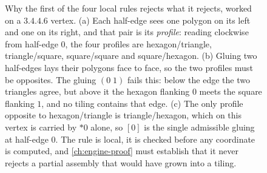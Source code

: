 \begin{figure}[htbp]
\centering

\caption[The mismatch rule, worked on $3.4.4.6$]{Why the first of the four
local rules rejects what it rejects, worked on a $3.4.4.6$ vertex. (a) Each
half-edge sees one polygon on its left and one on its right, and that pair is
its \emph{profile}: reading clockwise from half-edge $0$, the four profiles are
hexagon/triangle, triangle/square, square/square and square/hexagon. (b)
Gluing two half-edges lays their polygons face to face, so the two profiles
must be opposites. The gluing $(0\;1)$ fails this: below the edge the two
triangles agree, but above it the hexagon flanking $0$ meets the square
flanking $1$, and no tiling contains that edge. (c) The only profile opposite
to hexagon/triangle is triangle/hexagon, which on this vertex is carried by
$*0$ alone, so $[0]$ is the single admissible gluing at half-edge $0$. The
rule is local, it is checked before any coordinate is computed, and
\cref{ch:engine-proof} must establish that it never rejects a partial assembly
that would have grown into a tiling.}
\label{fig:gluing-profile}
\end{figure}
